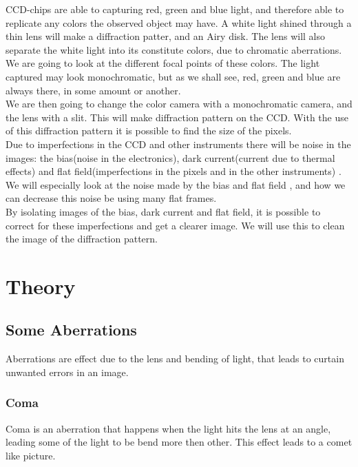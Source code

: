 \documentclass{emulateapj}
\begin{document}
CCD-chips are able to capturing red, green and blue light, and therefore able to replicate any colors the observed object may have. A white light shined through a thin lens will make a diffraction patter, and an Airy disk. The lens will also separate the white light into its constitute colors, due to chromatic aberrations. We are going to look at the different focal points of these colors. The light captured may look monochromatic, but as we shall see, red, green and blue are always there, in some amount or another. \\

We are then going to change the color camera with a monochromatic camera, and the lens with a slit. This will make diffraction pattern on the CCD. With the use of this diffraction pattern it is possible to find the size of the pixels.\\

Due to imperfections in the CCD and other instruments there will be noise in the images: the bias(noise in the electronics), dark current(current due to thermal effects) and flat field(imperfections in the pixels and in the other instruments) . We will especially look at the noise made by the bias  and flat field , and how we can decrease this noise be using many flat frames. \\

By isolating images of the bias, dark current and flat field, it is possible to correct for these imperfections and get a clearer image. We will use this to clean the image of the diffraction pattern.



\section{Theory}
\label{sec:theory}

\subsection{Some Aberrations}

Aberrations are effect due to the lens and bending of light, that leads to curtain unwanted errors in an image.

\subsubsection{Coma}
\label{sec:coma}
Coma is an aberration that happens when the light hits the lens at an angle, leading some of the light to be bend more then other. This effect leads to a comet like picture.
\end{document}
